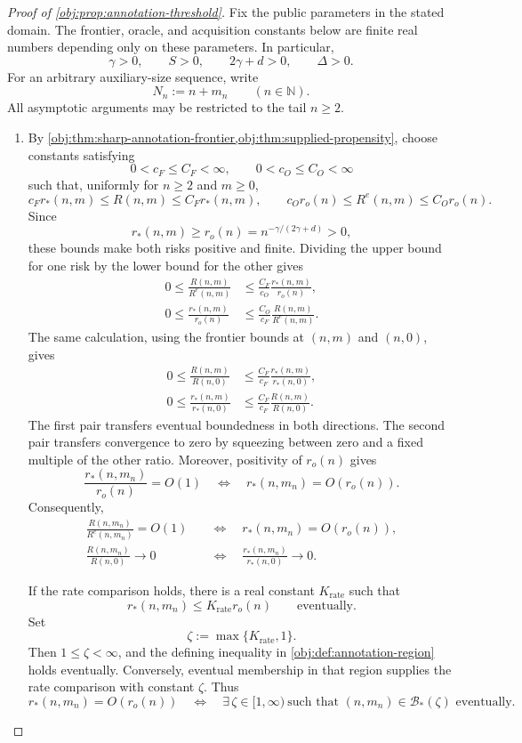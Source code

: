 \documentclass[11pt]{article}
\begin{document}
\begin{proof}[Proof of \cref{obj:prop:annotation-threshold}]
Fix the public parameters in the stated domain. The frontier, oracle, and acquisition constants below are finite real numbers depending only on these parameters. In particular,
\[
\gamma>0,\qquad S>0,\qquad 2\gamma+d>0,\qquad \Delta>0.
\]
For an arbitrary auxiliary-size sequence, write
\[
N_n:=n+m_n\qquad(n\in\mathbb N).
\]
All asymptotic arguments may be restricted to the tail \(n\ge2\).

\begin{enumerate}
\item\label{proof:annotation-threshold-risk-rate}
By \cref{obj:thm:sharp-annotation-frontier,obj:thm:supplied-propensity}, choose constants satisfying
\[
0<c_F\le C_F<\infty,\qquad 0<c_O\le C_O<\infty
\]
such that, uniformly for \(n\ge2\) and \(m\ge0\),
\[
c_F r_*(n,m)\le R(n,m)\le C_F r_*(n,m),
\qquad
c_O r_o(n)\le R^e(n,m)\le C_O r_o(n).
\]
Since
\[
r_*(n,m)\ge r_o(n)=n^{-\gamma/(2\gamma+d)}>0,
\]
these bounds make both risks positive and finite. Dividing the upper bound for one risk by the lower bound for the other gives
\[
\begin{aligned}
0\le \frac{R(n,m)}{R^e(n,m)}
&\le \frac{C_F}{c_O}\frac{r_*(n,m)}{r_o(n)},\\
0\le \frac{r_*(n,m)}{r_o(n)}
&\le \frac{C_O}{c_F}\frac{R(n,m)}{R^e(n,m)}.
\end{aligned}
\]
The same calculation, using the frontier bounds at \((n,m)\) and \((n,0)\), gives
\[
\begin{aligned}
0\le \frac{R(n,m)}{R(n,0)}
&\le \frac{C_F}{c_F}\frac{r_*(n,m)}{r_*(n,0)},\\
0\le \frac{r_*(n,m)}{r_*(n,0)}
&\le \frac{C_F}{c_F}\frac{R(n,m)}{R(n,0)}.
\end{aligned}
\]
The first pair transfers eventual boundedness in both directions. The second pair transfers convergence to zero by squeezing between zero and a fixed multiple of the other ratio. Moreover, positivity of \(r_o(n)\) gives
\[
\frac{r_*(n,m_n)}{r_o(n)}=O(1)
\quad\Longleftrightarrow\quad
r_*(n,m_n)=O(r_o(n)).
\]
Consequently,
\[
\begin{aligned}
\frac{R(n,m_n)}{R^e(n,m_n)}=O(1)
&\quad\Longleftrightarrow\quad r_*(n,m_n)=O(r_o(n)),\\
\frac{R(n,m_n)}{R(n,0)}\longrightarrow0
&\quad\Longleftrightarrow\quad
\frac{r_*(n,m_n)}{r_*(n,0)}\longrightarrow0.
\end{aligned}
\]

If the rate comparison holds, there is a real constant \(K_{\mathrm{rate}}\) such that
\[
r_*(n,m_n)\le K_{\mathrm{rate}}r_o(n)
\qquad\text{eventually}.
\]
Set
\[
\zeta:=\max\{K_{\mathrm{rate}},1\}.
\]
Then \(1\le\zeta<\infty\), and the defining inequality in
\cref{obj:def:annotation-region} holds eventually. Conversely, eventual membership in that region supplies the rate comparison with constant \(\zeta\). Thus
\[
r_*(n,m_n)=O(r_o(n))
\quad\Longleftrightarrow\quad
\exists\,\zeta\in[1,\infty)\ 
\text{such that }(n,m_n)\in\mathcal B_*(\zeta)
\text{ eventually}.
\]


\end{enumerate}
\end{proof}
\end{document}
